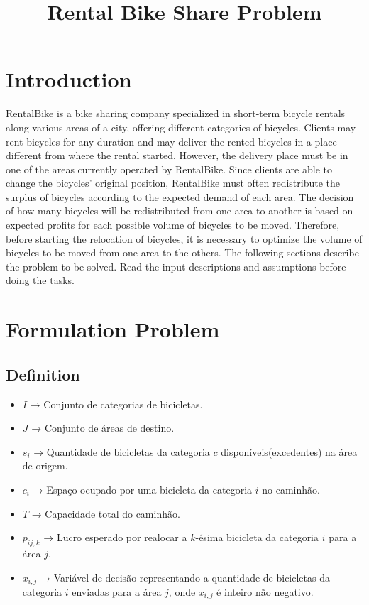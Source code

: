 \documentclass[]{article}
\title{Rental Bike Share Problem}
\author{}
\begin{document}
\maketitle

\section{Introduction}
 
RentalBike is a bike sharing company specialized in short-term bicycle rentals along various areas of a city, offering different categories of bicycles. Clients may rent bicycles for any duration and may deliver the rented bicycles in a place different from where the rental started. However, the delivery place must be in one of the areas currently operated by RentalBike. Since clients are able to change the bicycles’ original position, RentalBike must often redistribute the surplus of bicycles according to the expected demand of each area. 
The decision of how many bicycles will be redistributed from one area to another is based on expected profits for each possible volume of bicycles to be moved. Therefore, before starting the relocation of bicycles, it is necessary to optimize the volume of bicycles to be moved from one area to the others. 
The following sections describe the problem to be solved. Read the input descriptions and assumptions before doing the tasks. 


\section{Formulation Problem}


\subsection{Definition}

\begin{itemize}
	\item $I$ → Conjunto de categorias de bicicletas.
	\item $J$ → Conjunto de áreas de destino.
	\item $s_i$ → Quantidade de bicicletas da categoria $c$ disponíveis(excedentes) na área de origem.
	\item $c_i$ → Espaço ocupado por uma bicicleta da categoria $i$ no caminhão.
	\item $T$ → Capacidade total do caminhão.
	\item $p_{ij,k}$ → Lucro esperado por realocar a $k$-ésima bicicleta da categoria $i$ para a área $j$.
	\item $x_{i,j}$ → Variável de decisão representando a quantidade de bicicletas da categoria $i$ enviadas para a área $j$, onde $x_{i,j}$ é inteiro não negativo.
\end{itemize}
\end{document}
